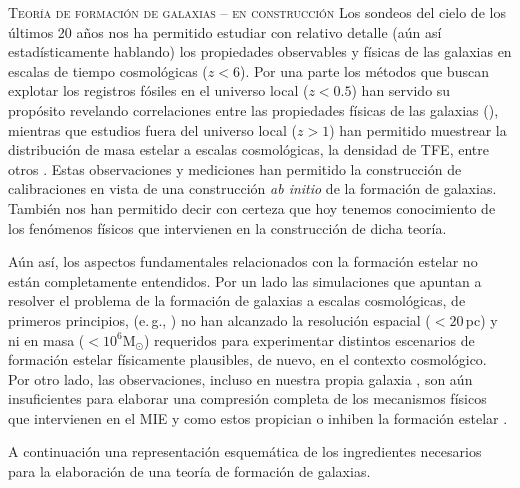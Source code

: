 \documentclass[xcolor=dvipsnames,4pt,hyperref={colorlinks,citecolor=black,linkcolor=black,urlcolor=black}]{beamer}
\begin{document}
\begin{frame}[allowframebreaks]{\textsc{Teoría de formación de galaxias -- en construcción}}
Los sondeos del cielo de los últimos 20 años nos ha permitido estudiar con relativo detalle (aún así
estadísticamente hablando) los propiedades observables y físicas de las galaxias en escalas de
tiempo cosmológicas ($z<6$). Por una parte los métodos que buscan explotar los registros fósiles en
el universo local ($z<0.5$) han servido su propósito revelando correlaciones entre las propiedades
físicas de las galaxias (\cites[la relación masa-metalicidad,][]{Tremonti2004, Sanchez2013}[la
relación edad-metalicidad,][]{Worthey1994, Gallazzi2005, Panter2008}), mientras que estudios fuera
del universo local ($z>1$) han permitido muestrear la distribución de masa estelar a escalas
cosmológicas, la densidad de TFE, entre otros \citep[véase][para una revisión completa]{Madau2014}.
Estas observaciones y mediciones han permitido la construcción de calibraciones en vista de una
construcción \emph{ab initio} de la formación de galaxias. También nos han permitido decir con
certeza que hoy tenemos conocimiento de los fenómenos físicos que intervienen en la construcción de
dicha teoría.

Aún así, los aspectos fundamentales relacionados con la formación estelar no están completamente
entendidos. Por un lado las simulaciones que apuntan a resolver el problema de la formación de
galaxias a escalas cosmológicas, de primeros principios, (e.\,g.,
\cites[\textsc{millenium}][]{Springel2005c}[\textsc{illustris}][]{Vogelsberger2014}) no han
alcanzado la resolución espacial ($<20\,$pc) y ni en masa ($<10^6$M$_\odot$) requeridos para
experimentar distintos escenarios de formación estelar físicamente plausibles, de nuevo, en el
contexto cosmológico. Por otro lado, las observaciones, incluso en nuestra propia galaxia
\citep[e.\,g.][]{Lada2010}, son aún insuficientes para elaborar una compresión completa de los
mecanismos físicos que intervienen en el MIE y como estos propician o inhiben la formación estelar
\citep[véase][para revisiones recientes]{McKee2007, Krumholz2014, Naab2016}.

A continuación una representación esquemática de los ingredientes necesarios para la elaboración de
una teoría de formación de galaxias.
%
%
%
\end{frame}
\end{document}
